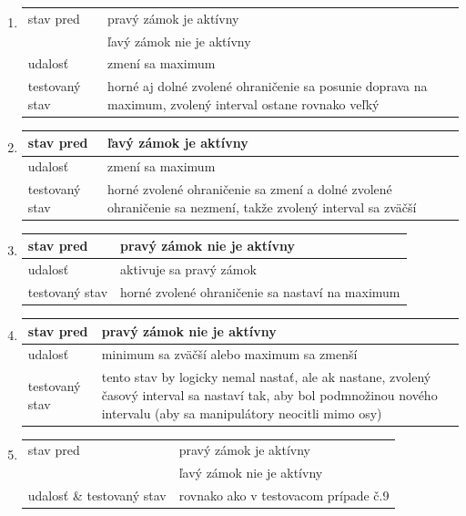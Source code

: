 \documentclass[
  printed, %
  twoside, %
  notable,   %
  nolof,   %
  nolot,   %
]{fithesis3}
\begin{document}
\begin{enumerate}
  \item
  \begin{tabular}{ | p{2.75cm} | p{8cm} | }
    \hline
    stav pred & pravý zámok je aktívny \\
    & ľavý zámok nie je aktívny \\ \hline
    udalosť & zmení sa maximum \\ \hline
    testovaný stav & horné aj dolné zvolené ohraničenie sa posunie doprava na maximum, zvolený interval ostane rovnako veľký \\ \hline
  \end{tabular}

  \item
  \begin{tabular}{ | p{2.75cm} | p{8cm} | }
    \hline
    stav pred & ľavý zámok je aktívny \\ \hline
    udalosť & zmení sa maximum \\ \hline
    testovaný stav & horné zvolené ohraničenie sa zmení a dolné zvolené ohraničenie sa nezmení, takže zvolený interval sa zväčší \\ \hline
  \end{tabular}
  
    \item
  \begin{tabular}{ | p{2.75cm} | p{8cm} | }
    \hline
    stav pred & pravý zámok nie je aktívny \\ \hline
    udalosť & aktivuje sa pravý zámok \\ \hline
    testovaný stav & horné zvolené ohraničenie sa nastaví na maximum \\ \hline
  \end{tabular}

    \item
  \begin{tabular}{ | p{2.75cm} | p{8cm} | }
    \hline
    stav pred & pravý zámok nie je aktívny \\ \hline
    udalosť & minimum sa zväčší alebo maximum sa zmenší\\ \hline
    testovaný stav & tento stav by logicky nemal nastať, ale ak nastane, zvolený časový interval sa nastaví tak, aby bol podmnožinou nového intervalu (aby sa manipulátory neocitli mimo osy) \\ \hline
  \end{tabular}

    \item
  \begin{tabular}{ | p{2.75cm} | p{8cm} | }
    \hline
    stav pred & pravý zámok je aktívny \\
    & ľavý zámok nie je aktívny \\ \hline
    udalosť \& testovaný stav & rovnako ako v testovacom prípade č.9\\ \hline
  \end{tabular}

\end{enumerate}
\end{document}
